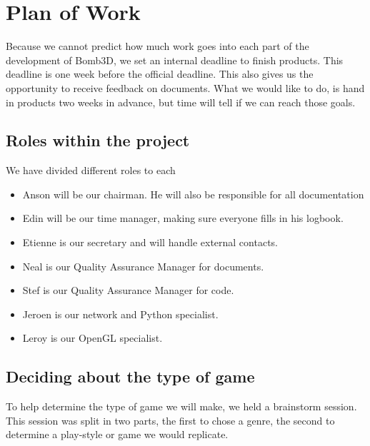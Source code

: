 \chapter{Plan of Work} %
\label{cha:plan_of_work}
    Because we cannot predict how much work goes into each part of the development of Bomb3D, we set an internal deadline to finish products. This deadline is one week before the official deadline. This also gives us the opportunity to receive feedback on documents. What we would like to do, is hand in products two weeks in advance, but time will tell if we can reach those goals. \\


    \section{Roles within the project} %
    \label{sub:roles_within_the_project}
        We have divided different roles to each

        \begin{itemize}
            \item Anson will be our chairman. He will also be responsible for all documentation
            \item Edin will be our time manager, making sure everyone fills in his logbook.
            \item Etienne is our secretary and will handle external contacts.
            \item Neal is our Quality Assurance Manager for documents.
            \item Stef is our Quality Assurance Manager for code.
            \item Jeroen is our network and Python specialist.
            \item Leroy is our OpenGL specialist.
        \end{itemize}



    \section{Deciding about the type of game} %
    \label{sec:decisions_about_the_game}
        To help determine the type of game we will make, we held a brainstorm session. This session was split in two parts, the first to chose a genre, the second to determine a play-style or game we would replicate.

